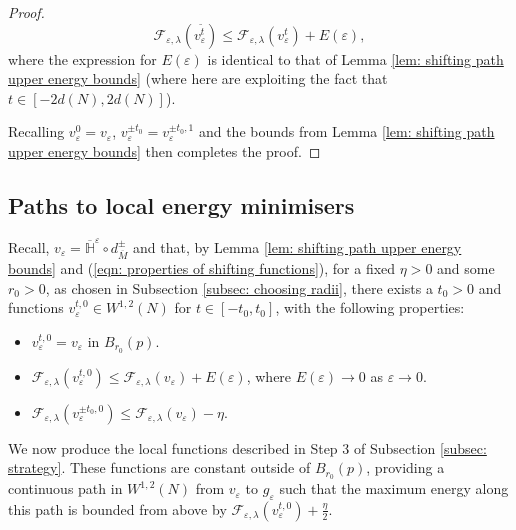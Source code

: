 \documentclass[11pt]{article}
\begin{document}
\begin{proof}
\begin{equation*}
    \mathcal{F}_{\varepsilon,\lambda}(v^{\tilde{t}}_\varepsilon) \leq \mathcal{F}_{\varepsilon,\lambda}(v^t_\varepsilon) + E(\varepsilon),
\end{equation*}
where the expression for $E(\varepsilon)$ is identical to that of Lemma \ref{lem: shifting path upper energy bounds} (where here are exploiting the fact that $t \in [-2d(N),2d(N)]$).

\bigskip

Recalling $v^0_\varepsilon = v_\varepsilon$, $v^{\pm t_0}_\varepsilon = v^{\pm t_0, 1}_\varepsilon$ and the bounds from Lemma \ref{lem: shifting path upper energy bounds} then completes the proof.
\end{proof}


\subsection{Paths to local energy minimisers}\label{subsec: local path}

Recall, $v_\varepsilon = \overline{\mathbb{H}}^\varepsilon 
\circ d^\pm_{\overline{M}}$ and that, by Lemma \ref{lem: shifting path upper energy bounds} and (\ref{eqn: properties of shifting functions}), for a fixed $\eta > 0$ and some $r_0 > 0$, as chosen in Subsection \ref{subsec: choosing radii}, there exists a $t_0 > 0$ and functions $v^{t,0}_\varepsilon \in W^{1,2}(N)$ for $t \in [-t_0,t_0]$, with the following properties:
\begin{itemize}
    \item $v^{t,0}_\varepsilon = v_\varepsilon$ in $B_{r_0}(p)$.

    \item $\mathcal{F}_{\varepsilon,\lambda}(v^{t,0}_\varepsilon) \leq \mathcal{F}_{\varepsilon,\lambda}(v_\varepsilon) + E(\varepsilon)$, where $E(\varepsilon) \rightarrow 0$ as $\varepsilon \rightarrow 0$.

    \item $\mathcal{F}_{\varepsilon,\lambda}(v^{\pm t_0,0}_\varepsilon) \leq \mathcal{F}_{\varepsilon,\lambda}(v_\varepsilon) - \eta$.
\end{itemize}
We now produce the local functions described in Step 3 of Subsection \ref{subsec: strategy}. These functions are constant outside of $B_{r_0}(p)$, providing a continuous path in $W^{1,2}(N)$ from $v_\varepsilon$ to $g_\varepsilon$ such that the maximum energy along this path is bounded from above by $\mathcal{F}_{\varepsilon,\lambda}(v^{t,0}_\varepsilon) + \frac{\eta}{2}$.
\end{document}
